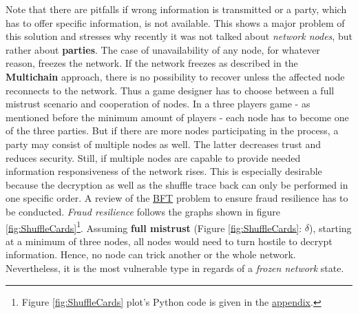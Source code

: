 \noindent Note that there are pitfalls if wrong information is transmitted or a party, which has to offer specific information, is not available.
This shows a major problem of this solution and stresses why recently it was not talked about \textit{network nodes}, but rather about \textbf{parties}.
The case of unavailability of any node, for whatever reason, freezes the network.
If the network freezes as described in the \textbf{Multichain} approach, there is no possibility to recover unless the affected node reconnects to the network.
Thus a game designer has to choose between a full mistrust scenario and cooperation of nodes.
In a three players game - as mentioned before the minimum amount of players - each node has to become one of the three parties.
But if there are more nodes participating in the process, a party may consist of multiple nodes as well.
The latter decreases trust and reduces security.
Still, if multiple nodes are capable to provide needed information responsiveness of the network rises.
This is especially desirable because the decryption as well as the shuffle trace back can only be performed in one specific order.
A review of the \hyperref[sec:ByzantineFaultTolerance]{BFT} problem to ensure fraud resilience has to be conducted.
\textit{Fraud resilience} follows the graphs shown in
figure \ref{fig:ShuffleCards}\footnote{\hspace{0.1cm}Figure \ref{fig:ShuffleCards} plot's Python code is given in the \hyperref[script:BFTshufflingCards]{appendix}.}.
Assuming \textbf{full mistrust} (Figure \ref{fig:ShuffleCards}: $\delta$), starting at a minimum of three nodes, all nodes would need to turn hostile to decrypt information.
Hence, no node can trick another or the whole network.
Nevertheless, it is the most vulnerable type in regards of a \textit{frozen network} state.
\begin{figure}
\end{figure}
